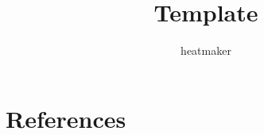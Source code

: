 \documentclass{article}
\author{heatmaker}
\title{Template}
\begin{document}
\maketitle
\clearpage


\clearpage
\section{References}

\printbibliography
\end{document}
